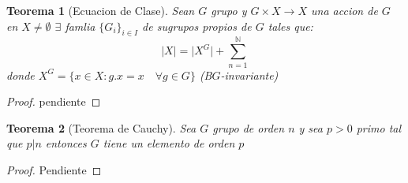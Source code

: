 \documentclass[10pt]{extarticle}
\theoremstyle{break}
\newtheorem{theorem}{Teorema}[section]
\theoremstyle{definition}
\begin{document}
\begin{theorem}[Ecuacion de Clase]
	Sean $G$ grupo y $ G\times X\longrightarrow X $ una accion de $G$ en $ X\neq \emptyset$ $ \exists  $ famlia $ \{G_{i}\}_{i\in I } $ de sugrupos propios de $G$ tales que:
	$$\lvert X \rvert =\lvert X^{G} \rvert + \sum_{n=1}^{\mathbb{N}} $$
	donde $ X^{G} = \{x\in X: g.x=x\quad\forall g\in G \} $ (B$ G $-invariante)
\end{theorem}
\begin{proof}
	pendiente	
\end{proof}

\begin{theorem}[Teorema de Cauchy]
	Sea $G$ grupo de orden $ n $ y sea $ p>0 $ primo tal que $ p|n $ entonces $G$ tiene un elemento de orden $ p $
\end{theorem}
\begin{proof}
	Pendiente
\end{proof}
\end{document}
